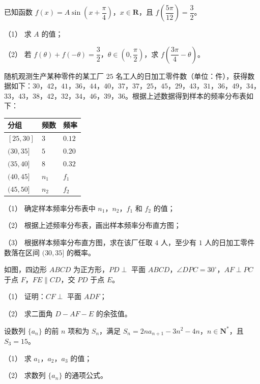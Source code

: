 \begin{question}
已知函数 $f(x)=A\sin\left(x+\dfrac\pi4\right)$，$x\in\mathbf R$，且 $f\left(\dfrac{5\pi}{12}\right)=\dfrac32$。

（1） 求 $A$ 的值；

（2） 若 $f(\theta)+f(-\theta)=\dfrac32$，$\theta\in\left(0,\dfrac\pi2\right)$，求 $f\left(\dfrac{3\pi}4-\theta\right)$。

\end{question}
\begin{question}
随机观测生产某种零件的某工厂 $25$ 名工人的日加工零件数（单位：件），获得数据如下：$30$，$42$，$41$，$36$，$44$，$40$，$37$，$37$，$25$，$45$，$29$，$43$，$31$，$36$，$49$，$34$，$33$，$43$，$38$，$42$，$32$，$34$，$46$，$39$，$36$。根据上述数据得到样本的频率分布表如下：

\begin{center}
\begin{tabular}{lll}
\toprule
分组 & 频数 & 频率 \\
\midrule
$[25,30]$ & $3$ & $0.12$ \\
$(30,35]$ & $5$ & $0.20$ \\
$(35,40]$ & $8$ & $0.32$ \\
$(40,45]$ & $n_1$ & $f_1$ \\
$(45,50]$ & $n_2$ & $f_2$ \\
\bottomrule
\end{tabular}
\end{center}

（1） 确定样本频率分布表中 $n_1$，$n_2$，$f_1$ 和 $f_2$ 的值；

（2） 根据上述频率分布表，画出样本频率分布直方图；

（3） 根据样本频率分布直方图，求在该厂任取 $4$ 人，至少有 $1$ 人的日加工零件数落在区间 $(30,35]$ 的概率。

\Needspace{0.4\textheight}
\end{question}
\begin{question}
如图，四边形 $ABCD$ 为正方形，$PD\perp$ 平面 $ABCD$，$\angle DPC=30^\circ$，$AF\perp PC$ 于点 $F$，$FE\parallel CD$，交 $PD$ 于点 $E$。
\nopagebreak[4]
\begin{center}\end{center}
\nopagebreak[4]
（1） 证明：$CF\perp$ 平面 $ADF$；

（2） 求二面角 $D-AF-E$ 的余弦值。

\end{question}
\begin{question}
设数列 $\{a_n\}$ 的前 $n$ 项和为 $S_n$，满足 $S_n=2na_{n+1}-3n^2-4n$，$n\in\mathbf N^*$，且 $S_3=15$。

（1） 求 $a_1$，$a_2$，$a_3$ 的值；

（2） 求数列 $\{a_n\}$ 的通项公式。

\end{question}
